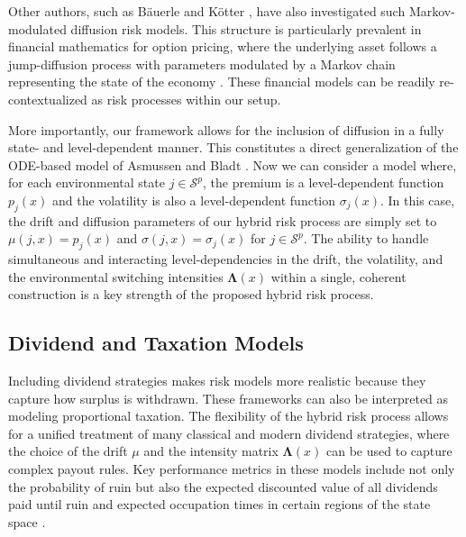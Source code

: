 \documentclass[11pt]{article}
\numberwithin{table}{section}
\numberwithin{figure}{section}
\numberwithin{equation}{section}
\newcommand{\1}{{\mathbf 1}}
\newcommand{\0}{\mat{0}}
\begin{document}
Other authors, such as Bäuerle and Kötter \cite{bauerle2005markov}, have also investigated such Markov-modulated diffusion risk models. This structure is particularly prevalent in financial mathematics for option pricing, where the underlying asset follows a jump-diffusion process with parameters modulated by a Markov chain representing the state of the economy \cite{elliott2007pricing}. These financial models can be readily re-contextualized as risk processes within our setup.

More importantly, our framework allows for the inclusion of diffusion in a fully state- and level-dependent manner. This constitutes a direct generalization of the ODE-based model of Asmussen and Bladt \cite{asmussen1996phase}. Now we can consider a model where, for each environmental state \(j \in \mathcal{S}^p\), the premium is a level-dependent function \(p_j(x)\) and the volatility is also a level-dependent function \(\sigma_j(x)\). In this case, the drift and diffusion parameters of our hybrid risk process are simply set to \(\mu(j,x) = p_j(x)\) and \(\sigma(j,x) = \sigma_j(x)\) for \(j \in \mathcal{S}^p\). The ability to handle simultaneous and interacting level-dependencies in the drift, the volatility, and the environmental switching intensities \(\bm{\Lambda}(x)\) within a single, coherent construction is a key strength of the proposed hybrid risk process.
\subsection{Dividend and Taxation Models}

Including dividend strategies makes risk models more realistic because they capture how surplus is withdrawn. These frameworks can also be interpreted as modeling proportional taxation. The flexibility of the hybrid risk process allows for a unified treatment of many classical and modern dividend strategies, where the choice of the drift \(\mu\) and the intensity matrix \(\bm{\Lambda}(x)\) can be used to capture complex payout rules. Key performance metrics in these models include not only the probability of ruin but also the expected discounted value of all dividends paid until ruin and expected occupation times in certain regions of the state space \cite{gerber2012omega}.
\end{document}
